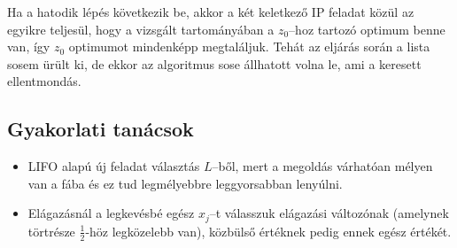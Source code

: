 Ha a hatodik lépés következik be, akkor a két keletkező IP feladat közül az
egyikre teljesül, hogy a vizsgált tartományában a $z_0$--hoz tartozó optimum
benne van, így $z_0$ optimumot mindenképp megtaláljuk. Tehát az eljárás során a
lista sosem ürült ki, de ekkor az algoritmus sose állhatott volna le, ami a
keresett ellentmondás.

\subsection{Gyakorlati tanácsok}
\begin{itemize}
  \item LIFO alapú új feladat választás $L$--ből, mert a megoldás várhatóan
  mélyen van a fába és ez tud legmélyebbre leggyorsabban lenyúlni.
  \item Elágazásnál a legkevésbé egész $x_j$--t válasszuk elágazási változónak
  (amelynek törtrésze $\frac{1}{2}$-höz legközelebb van), közbülső értéknek
  pedig ennek egész értékét.
\end{itemize}
